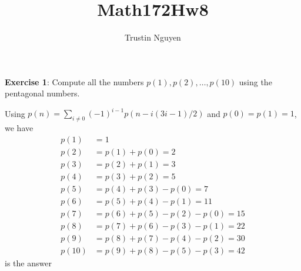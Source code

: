\documentclass{article}
\title{Math172Hw8}
\author{Trustin Nguyen}
\begin{document}
    \maketitle

\reversemarginpar

\textbf{Exercise 1}: Compute all the numbers $p(1), p(2), \ldots, p(10)$ using the pentagonal numbers.
    \begin{answer}
        Using $p(n) = \sum_{i \neq 0} (-1)^{i - 1}p(n - i(3i - 1)/2)$ and $p(0) = p(1) = 1$,  we have
            \begin{align*}
                p(1)  &= 1                              \\
                p(2)  &= p(1) + p(0) = 2                \\
                p(3)  &= p(2) + p(1) = 3                \\
                p(4)  &= p(3) + p(2) = 5                \\
                p(5)  &= p(4) + p(3) - p(0) = 7         \\
                p(6)  &= p(5) + p(4) - p(1) = 11        \\
                p(7)  &= p(6) + p(5) - p(2) - p(0) = 15 \\
                p(8)  &= p(7) + p(6) - p(3) - p(1) = 22 \\
                p(9)  &= p(8) + p(7) - p(4) - p(2) = 30 \\
                p(10) &= p(9) + p(8) - p(5) - p(3) = 42   
            \end{align*}
        is the answer
    \end{answer}
\end{document}
